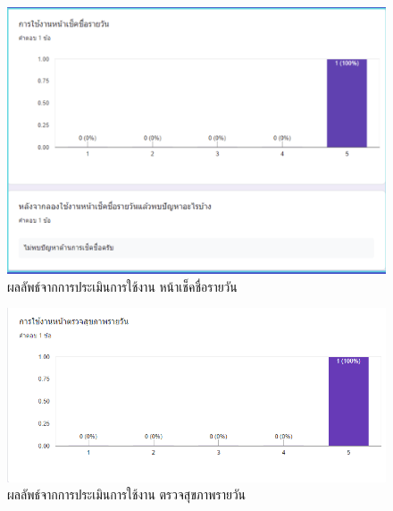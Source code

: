 \begin{figure}
  \begin{center}
    \includegraphics[width=\linewidth]{images/eval3.png}
  \end{center}
  \caption[ผลลัพธ์จากการประเมินการใช้งาน หน้าเช็คชื่อรายวัน]{ผลลัพธ์จากการประเมินการใช้งาน หน้าเช็คชื่อรายวัน}
  \label{fig:Eval3}
\end{figure}

\begin{figure}
  \begin{center}
    \includegraphics[width=\linewidth]{images/eval5.png}
  \end{center}
  \caption[ผลลัพธ์จากการประเมินการใช้งาน ตรวจสุขภาพรายวัน]{ผลลัพธ์จากการประเมินการใช้งาน ตรวจสุขภาพรายวัน}
  \label{fig:Eval5}
\end{figure}

